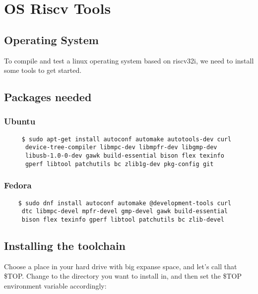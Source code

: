 
\chapter{OS Riscv Tools}

\section{Operating System}

To compile and test a linux operating system based on riscv32i, we need to install some tools to get started. 

\section{Packages needed}

\subsection{Ubuntu}
\begin{verbatim}
     $ sudo apt-get install autoconf automake autotools-dev curl 
      device-tree-compiler libmpc-dev libmpfr-dev libgmp-dev 
      libusb-1.0-0-dev gawk build-essential bison flex texinfo 
      gperf libtool patchutils bc zlib1g-dev pkg-config git

\end{verbatim}

\subsection{Fedora}

\begin{verbatim}
    $ sudo dnf install autoconf automake @development-tools curl
     dtc libmpc-devel mpfr-devel gmp-devel gawk build-essential 
     bison flex texinfo gperf libtool patchutils bc zlib-devel
\end{verbatim}

\section{Installing the toolchain}

Choose a place in your hard drive with big expanse space, and let's call that \$TOP.
Change to the directory you want to install in, and then set the \$TOP environment variable accordingly:

